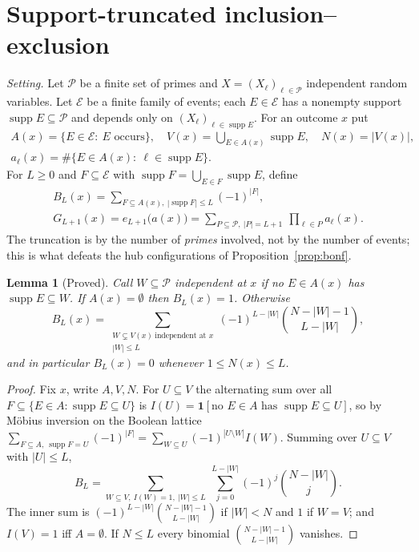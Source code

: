\documentclass[11pt,reqno]{amsart}
\newtheorem{lemma}[theorem]{Lemma}
\theoremstyle{definition}
\newcommand{\supp}{\operatorname{supp}}
\begin{document}
\section{Support-truncated inclusion--exclusion}\label{sec:supp}

\emph{Setting.}  Let $\mathcal P$ be a finite set of primes and
$X=(X_\ell)_{\ell\in\mathcal P}$ independent random variables.  Let $\mathcal E$ be
a finite family of events; each $E\in\mathcal E$ has a nonempty support
$\supp E\subseteq\mathcal P$ and depends only on
$(X_\ell)_{\ell\in\supp E}$.  For an outcome $x$ put
\begin{gather*}
 A(x)=\{E\in\mathcal E:\ E\text{ occurs}\},\quad
 V(x)=\bigcup_{E\in A(x)}\supp E,\quad N(x)=|V(x)|,\\
 a_\ell(x)=\#\{E\in A(x):\ \ell\in\supp E\}.
\end{gather*}
For $L\ge0$ and $F\subseteq\mathcal E$ with $\supp F=\bigcup_{E\in F}\supp E$, define
\begin{gather*}
 B_L(x)=\sum_{F\subseteq A(x),\ |\supp F|\le L}(-1)^{|F|},\\
 G_{L+1}(x)=e_{L+1}\big(a(x)\big)=\sum_{P\subseteq\mathcal P,\ |P|=L+1}\ \prod_{\ell\in P}a_\ell(x).
\end{gather*}
The truncation is by the number of \emph{primes} involved, not by the number of
events; this is what defeats the hub configurations of
Proposition~\ref{prop:bonf}.

\begin{lemma}[Proved]\label{lem:closed}
Call $W\subseteq\mathcal P$ independent at $x$ if no $E\in A(x)$ has
$\supp E\subseteq W$.  If $A(x)=\emptyset$ then $B_L(x)=1$.
Otherwise
\[
 B_L(x)=\sum_{\substack{W\subsetneq V(x)\ \text{independent at }x\\ |W|\le L}}
 (-1)^{L-|W|}\binom{N-|W|-1}{L-|W|},
\]
and in particular $B_L(x)=0$ whenever $1\le N(x)\le L$.
\end{lemma}

\begin{proof}
Fix $x$, write $A,V,N$.  For $U\subseteq V$ the alternating sum over all
$F\subseteq\{E\in A:\supp E\subseteq U\}$ is
$I(U)=\mathbf 1[\text{no }E\in A\text{ has }\supp E\subseteq U]$, so by M\"obius
inversion on the Boolean lattice
$\sum_{F\subseteq A,\ \supp F=U}(-1)^{|F|}=\sum_{W\subseteq U}(-1)^{|U\setminus W|}I(W)$.
Summing over $U\subseteq V$ with $|U|\le L$,
\[
 B_L=\sum_{W\subseteq V,\ I(W)=1,\ |W|\le L}\ \sum_{j=0}^{L-|W|}(-1)^j\binom{N-|W|}j .
\]
The inner sum is $(-1)^{L-|W|}\binom{N-|W|-1}{L-|W|}$ if $|W|<N$ and $1$ if $W=V$;
and $I(V)=1$ iff $A=\emptyset$.  If $N\le L$ every binomial
$\binom{N-|W|-1}{L-|W|}$ vanishes.
\end{proof}
\end{document}
